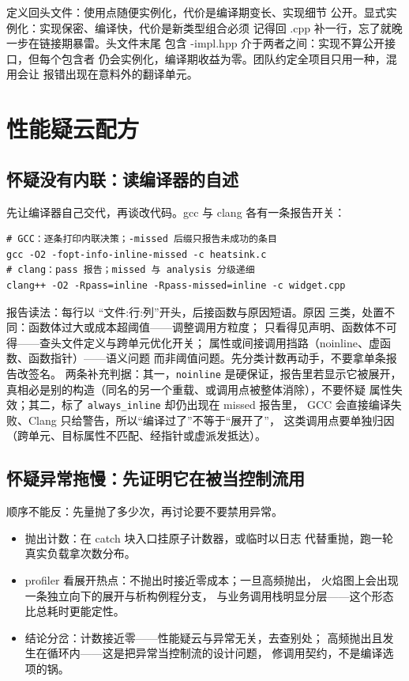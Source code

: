 \documentclass[12pt,a4paper,fontset=fandol]{ctexbook}
\newcommand{\Tp}[1]{\texttt{#1}}
\newcommand{\Bk}{\discretionary{}{}{}}
\begin{document}
\begin{compare}[title={回头文件 versus 显式实例化}]
定义回头文件：使用点随便实例化，代价是编译期变长、实现细节
公开。显式实例化：实现保密、编译快，代价是新类型组合必须
记得回 .cpp 补一行，忘了就晚一步在链接期暴雷。头文件末尾
包含 -impl.hpp 介于两者之间：实现不算公开接口，但每个包含者
仍会实例化，编译期收益为零。团队约定全项目只用一种，混用会让
报错出现在意料外的翻译单元。
\end{compare}

\section{性能疑云配方}

\subsection{怀疑没有内联：读编译器的自述}

先让编译器自己交代，再谈改代码。gcc 与 clang 各有一条报告开关：

\begin{lstlisting}[style=shellstyle]
# GCC：逐条打印内联决策；-missed 后缀只报告未成功的条目
gcc -O2 -fopt-info-inline-missed -c heatsink.c
# clang：pass 报告；missed 与 analysis 分级递细
clang++ -O2 -Rpass=inline -Rpass-missed=inline -c widget.cpp
\end{lstlisting}

报告读法：每行以 ``文件:行:列''开头，后接函数与原因短语。原因
三类，处置不同：函数体过大或成本超阈值——调整调用方粒度；
只看得见声明、函数体不可得——查头文件定义与跨单元优化开关；
属性或间接调用挡路（noinline、虚函数、函数指针）——语义问题
而非阈值问题。先分类计数再动手，不要拿单条报告改签名。
两条补充判据：其一，\Tp{noinline} 是硬保证，报告里若显示它被展开，
真相必是别的构造（同名的另一个重载、或调用点被整体消除），不要怀疑
属性失效；其二，标了 \Tp{always{\Bk}\_inline} 却仍出现在 missed 报告里，
GCC 会直接编译失败、Clang 只给警告，所以``编译过了''不等于``展开了''，
这类调用点要单独归因（跨单元、目标属性不匹配、经指针或虚派发抵达）。

\subsection{怀疑异常拖慢：先证明它在被当控制流用}

顺序不能反：先量抛了多少次，再讨论要不要禁用异常。

\begin{itemize}
\item 抛出计数：在 catch 块入口挂原子计数器，或临时以日志
      代替重抛，跑一轮真实负载拿次数分布。
\item profiler 看展开热点：不抛出时接近零成本；一旦高频抛出，
      火焰图上会出现一条独立向下的展开与析构例程分支，
      与业务调用栈明显分层——这个形态比总耗时更能定性。
\item 结论分岔：计数接近零——性能疑云与异常无关，去查别处；
      高频抛出且发生在循环内——这是把异常当控制流的设计问题，
      修调用契约，不是编译选项的锅。
\end{itemize}
\end{document}
